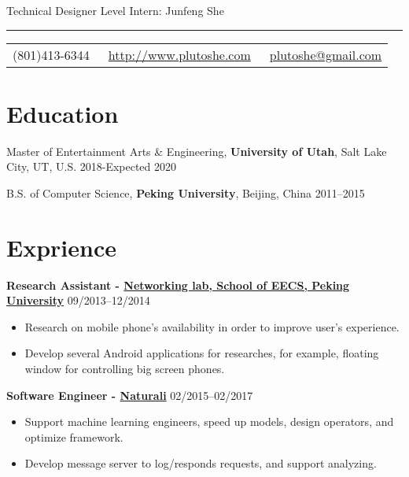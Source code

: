 \documentclass{article}
\begin{document}
	
	\color{text1} %
	
	\par{\centering
		{\sffamily\huge Technical Designer Level Intern: Junfeng She
		}\\	
		{\color{headings} \par}
		{\color{white} \hrule} %
		
		\vspace{10pt}
		
		\colorbox{mygrey}{\textcolor{text1}{
				\begin{tabular}{c|c|c}
					\raisebox{-2pt}{\Phone} (801)413-6344 &
					\raisebox{-2pt}{\Envelope} ~\href{http://www.plutoshe.com}{http://www.plutoshe.com}	 &	 \raisebox{0pt}{\textbf{@}}
					~\href{mailto:plutoshe@gmail.com}{plutoshe@gmail.com}
				\end{tabular}
			}
		}
		\vspace{10pt}
		
		\section{Education}
		\vspace{5pt}
		Master of Entertainment Arts \& Engineering, \textbf{University of Utah}, Salt Lake City, UT, U.S. \hfill 2018-Expected 2020
		\vspace{5pt}
		
		B.S. of Computer Science, \textbf{Peking University}, Beijing, China \hfill 2011--2015
		\vspace{10pt}
		
		\section{Exprience}
		\textbf{Research Assistant - \href{http://net.pku.edu.cn/mobile/doku.php?id=eng:start}{Networking lab, School of EECS, Peking University}} \hfill 09/2013--12/2014
			\begin{itemize}
				\item  Research on mobile phone's availability in order to improve user's experience.
				\item Develop several Android applications for researches, for example, floating window for controlling big screen phones.
			\end{itemize}
		\textbf{Software Engineer - \href{https://naturali.io}{Naturali}} \hfill 02/2015--02/2017
		\begin{itemize}
			\item Support machine learning engineers, speed up models, design operators, and optimize framework.
			\item Develop message server to log/responds requests, and support analyzing.
		\end{itemize}
		
}
\end{document}
